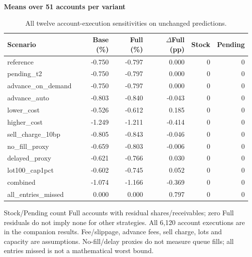 \begin{table}[!htb]
\centering\small
\setlength{\tabcolsep}{3pt}
\renewcommand{\arraystretch}{1.15}
\caption{All twelve account-execution sensitivities on unchanged predictions.}
\label{tab:execution}
\textbf{Means over 51 accounts per variant}\par\smallskip
\begin{tabular}{lrrrrr}
\hline
Scenario & Base (\%) & Full (\%) & $\Delta$Full (pp) & Stock & Pending \\
\hline
reference & -0.750 & -0.797 & 0.000 & 0 & 0 \\
pending\_t2 & -0.750 & -0.797 & 0.000 & 0 & 0 \\
advance\_on\_demand & -0.750 & -0.797 & 0.000 & 0 & 0 \\
advance\_auto & -0.803 & -0.840 & -0.043 & 0 & 0 \\
lower\_cost & -0.526 & -0.612 & 0.185 & 0 & 0 \\
higher\_cost & -1.249 & -1.211 & -0.414 & 0 & 0 \\
sell\_charge\_10bp & -0.805 & -0.843 & -0.046 & 0 & 0 \\
no\_fill\_proxy & -0.659 & -0.803 & -0.006 & 0 & 0 \\
delayed\_proxy & -0.621 & -0.766 & 0.030 & 0 & 0 \\
lot100\_cap1pct & -0.602 & -0.745 & 0.052 & 0 & 0 \\
combined & -1.074 & -1.166 & -0.369 & 0 & 0 \\
all\_entries\_missed & 0.000 & 0.000 & 0.797 & 0 & 0 \\
\hline
\end{tabular}\par\medskip
\begin{minipage}{\textwidth}\footnotesize Stock/Pending count Full accounts with residual shares/receivables; zero Full residuals do not imply none for other strategies. All 6,120 account executions are in the companion results. Fee/slippage, advance fees, sell charge, lots and capacity are assumptions. No-fill/delay proxies do not measure queue fills; all entries missed is not a mathematical worst bound.\end{minipage}
\end{table}
